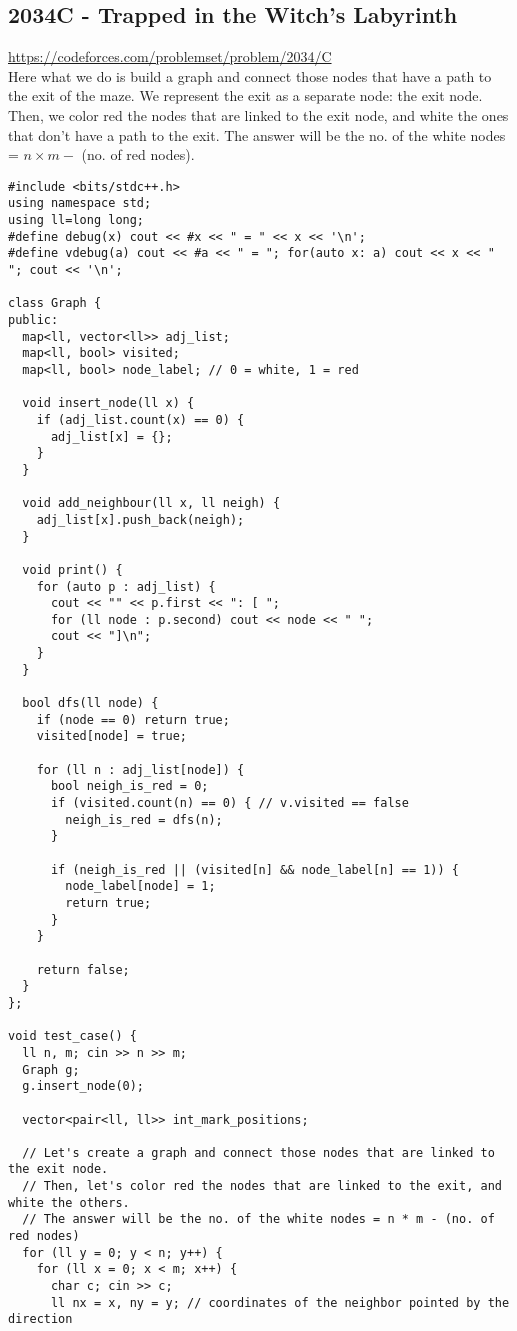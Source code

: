 \subsection{2034C - Trapped in the Witch's Labyrinth}
\url{https://codeforces.com/problemset/problem/2034/C} \\

Here what we do is build a graph and connect those nodes that have a path to the exit of the maze. We represent the exit as a separate node: the exit node. Then, we color red the nodes that are linked to the exit node, and white the ones that don't have a path to the exit. The answer will be the no. of the white nodes = $n \times m -$ (no. of red nodes).

\begin{verbatim}
#include <bits/stdc++.h>
using namespace std;
using ll=long long;
#define debug(x) cout << #x << " = " << x << '\n';
#define vdebug(a) cout << #a << " = "; for(auto x: a) cout << x << " "; cout << '\n';

class Graph {
public:
  map<ll, vector<ll>> adj_list;
  map<ll, bool> visited;
  map<ll, bool> node_label; // 0 = white, 1 = red
  
  void insert_node(ll x) { 
    if (adj_list.count(x) == 0) {
      adj_list[x] = {};
    }
  }

  void add_neighbour(ll x, ll neigh) {
    adj_list[x].push_back(neigh);
  }

  void print() {
    for (auto p : adj_list) {
      cout << "" << p.first << ": [ "; 
      for (ll node : p.second) cout << node << " ";
      cout << "]\n";
    }
  }

  bool dfs(ll node) {
    if (node == 0) return true;
    visited[node] = true;

    for (ll n : adj_list[node]) {
      bool neigh_is_red = 0;
      if (visited.count(n) == 0) { // v.visited == false
        neigh_is_red = dfs(n);
      } 
      
      if (neigh_is_red || (visited[n] && node_label[n] == 1)) {
        node_label[node] = 1;
        return true;
      } 
    }

    return false;
  }
}; 

void test_case() {
  ll n, m; cin >> n >> m;
  Graph g;
  g.insert_node(0);

  vector<pair<ll, ll>> int_mark_positions;

  // Let's create a graph and connect those nodes that are linked to the exit node.
  // Then, let's color red the nodes that are linked to the exit, and white the others.
  // The answer will be the no. of the white nodes = n * m - (no. of red nodes)
  for (ll y = 0; y < n; y++) {
    for (ll x = 0; x < m; x++) {
      char c; cin >> c;
      ll nx = x, ny = y; // coordinates of the neighbor pointed by the direction


\end{verbatim}

